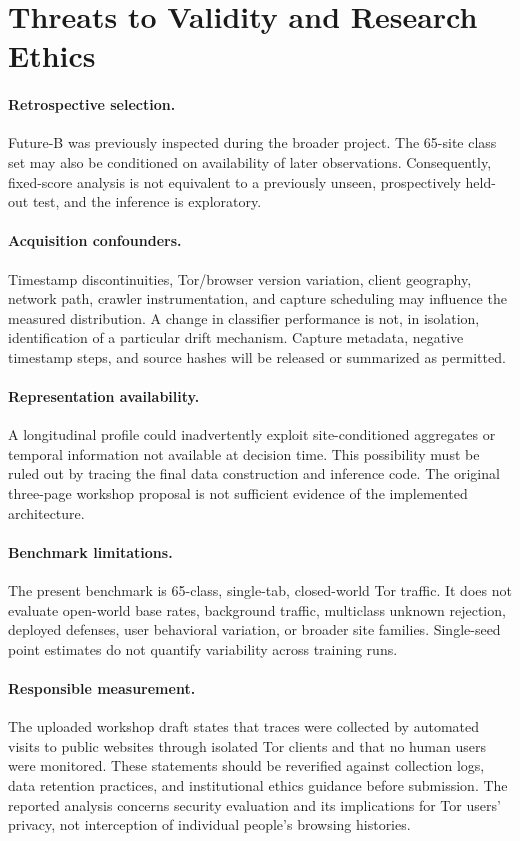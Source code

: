\section{Threats to Validity and Research Ethics}\label{sec:validity}
\paragraph{Retrospective selection.} Future-B was previously inspected during the broader project. The 65-site class set may also be conditioned on availability of later observations. Consequently, fixed-score analysis is not equivalent to a previously unseen, prospectively held-out test, and the inference is exploratory.

\paragraph{Acquisition confounders.} Timestamp discontinuities, Tor/browser version variation, client geography, network path, crawler instrumentation, and capture scheduling may influence the measured distribution. A change in classifier performance is not, in isolation, identification of a particular drift mechanism. Capture metadata, negative timestamp steps, and source hashes will be released or summarized as permitted.

\paragraph{Representation availability.} A longitudinal profile could inadvertently exploit site-conditioned aggregates or temporal information not available at decision time. This possibility must be ruled out by tracing the final data construction and inference code. The original three-page workshop proposal is not sufficient evidence of the implemented architecture.

\paragraph{Benchmark limitations.} The present benchmark is 65-class, single-tab, closed-world Tor traffic. It does not evaluate open-world base rates, background traffic, multiclass unknown rejection, deployed defenses, user behavioral variation, or broader site families. Single-seed point estimates do not quantify variability across training runs.

\paragraph{Responsible measurement.} The uploaded workshop draft states that traces were collected by automated visits to public websites through isolated Tor clients and that no human users were monitored. These statements should be reverified against collection logs, data retention practices, and institutional ethics guidance before submission. The reported analysis concerns security evaluation and its implications for Tor users' privacy, not interception of individual people's browsing histories.
